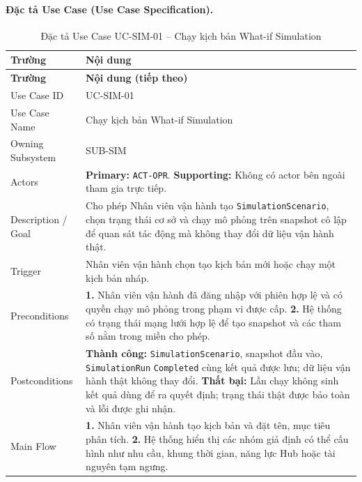 \paragraph{Đặc tả Use Case (Use Case Specification).}
\small
\begin{longtable}{|L{42mm}|L{102mm}|}
  \caption{Đặc tả Use Case UC-SIM-01 -- Chạy kịch bản What-if Simulation}\label{tab:spec-UC-SIM-01}\\
  \hline
  \centering\arraybackslash\textbf{Trường} & \centering\arraybackslash\textbf{Nội dung}\\
  \hline
  \endfirsthead
  \hline
  \centering\arraybackslash\textbf{Trường} & \centering\arraybackslash\textbf{Nội dung (tiếp theo)}\\
  \hline
  \endhead
  Use Case ID & UC-SIM-01\\\hline
  Use Case Name & Chạy kịch bản What-if Simulation\\\hline
  Owning Subsystem & SUB-SIM\\\hline
  Actors & \textbf{Primary:} \texttt{ACT-OPR}. \textbf{Supporting:} Không có actor bên ngoài tham gia trực tiếp.\\\hline
  Description / Goal & Cho phép Nhân viên vận hành tạo \texttt{SimulationScenario}, chọn trạng thái cơ sở và chạy mô phỏng trên snapshot cô lập để quan sát tác động mà không thay đổi dữ liệu vận hành thật.\\\hline
  Trigger & Nhân viên vận hành chọn tạo kịch bản mới hoặc chạy một kịch bản nháp.\\\hline
  Preconditions &
    \textbf{1.} Nhân viên vận hành đã đăng nhập với phiên hợp lệ và có quyền chạy mô phỏng trong phạm vi được cấp.\newline
    \textbf{2.} Hệ thống có trạng thái mạng lưới hợp lệ để tạo snapshot và các tham số nằm trong miền cho phép.\\\hline
  Postconditions &
    \textbf{Thành công:} \texttt{SimulationScenario}, snapshot đầu vào, \texttt{SimulationRun} \texttt{Completed} cùng kết quả được lưu; dữ liệu vận hành thật không thay đổi.\newline
    \textbf{Thất bại:} Lần chạy không sinh kết quả dùng để ra quyết định; trạng thái thật được bảo toàn và lỗi được ghi nhận.\\\hline
  Main Flow &
    \textbf{1.} Nhân viên vận hành tạo kịch bản và đặt tên, mục tiêu phân tích.\newline
    \textbf{2.} Hệ thống hiển thị các nhóm giả định có thể cấu hình như nhu cầu, khung thời gian, năng lực Hub hoặc tài nguyên tạm ngưng.\newline

\end{longtable}
